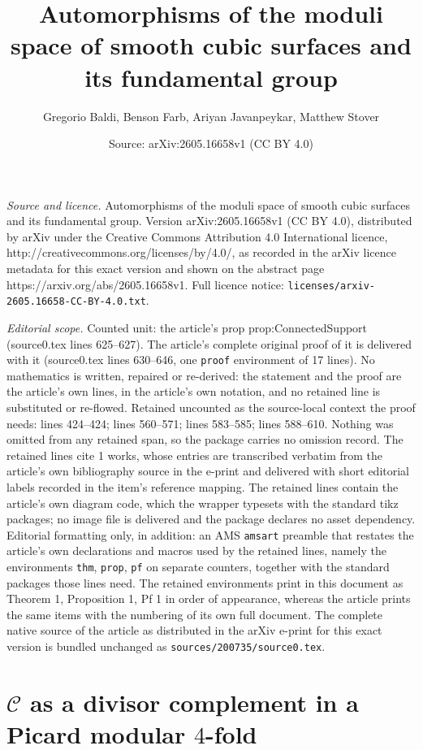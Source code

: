 \documentclass[10pt,a4paper]{amsart}
\title{Automorphisms of the moduli space of smooth cubic surfaces and its fundamental group}
\author{Gregorio Baldi, Benson Farb, Ariyan Javanpeykar, Matthew Stover}
\date{Source: arXiv:2605.16658v1 (CC BY 4.0)}
\newcommand{\calC}{\mathcal{C}}
\begin{document}
\maketitle

\noindent\emph{Source and licence.} Automorphisms of the moduli space of smooth cubic surfaces and its fundamental group. Version arXiv:2605.16658v1 (CC BY 4.0), distributed by arXiv under the Creative Commons Attribution 4.0 International licence, http://creativecommons.org/licenses/by/4.0/, as recorded in the arXiv licence metadata for this exact version and shown on the abstract page https://arxiv.org/abs/2605.16658v1. Full licence notice: \texttt{licenses/arxiv-2605.16658-CC-BY-4.0.txt}.\par\smallskip

\noindent\textit{Editorial scope.} Counted unit: the article's prop prop:ConnectedSupport (source0.tex lines 625--627). The article's complete original proof of it is delivered with it (source0.tex lines 630--646, one \texttt{proof} environment of 17 lines). No mathematics is written, repaired or re-derived: the statement and the proof are the article's own lines, in the article's own notation, and no retained line is substituted or re-flowed.  Retained uncounted as the source-local context the proof needs: lines 424--424; lines 560--571; lines 583--585; lines 588--610.  Nothing was omitted from any retained span, so the package carries no omission record.  The retained lines cite 1 works, whose entries are transcribed verbatim from the article's own bibliography source in the e-print and delivered with short editorial labels recorded in the item's reference mapping.  The retained lines contain the article's own diagram code, which the wrapper typesets with the standard tikz packages; no image file is delivered and the package declares no asset dependency.  Editorial formatting only, in addition: an AMS \texttt{amsart} preamble that restates the article's own declarations and macros used by the retained lines, namely the environments \texttt{thm}, \texttt{prop}, \texttt{pf} on separate counters, together with the standard packages those lines need.  The retained environments print in this document as Theorem 1, Proposition 1, Pf 1 in order of appearance, whereas the article prints the same items with the numbering of its own full document.  The complete native source of the article as distributed in the arXiv e-print for this exact version is bundled unchanged as \texttt{sources/200735/source0.tex}.
\section{$\calC$ as a divisor complement in a Picard modular $4$-fold}\label{sec:Prelims}
\end{document}
